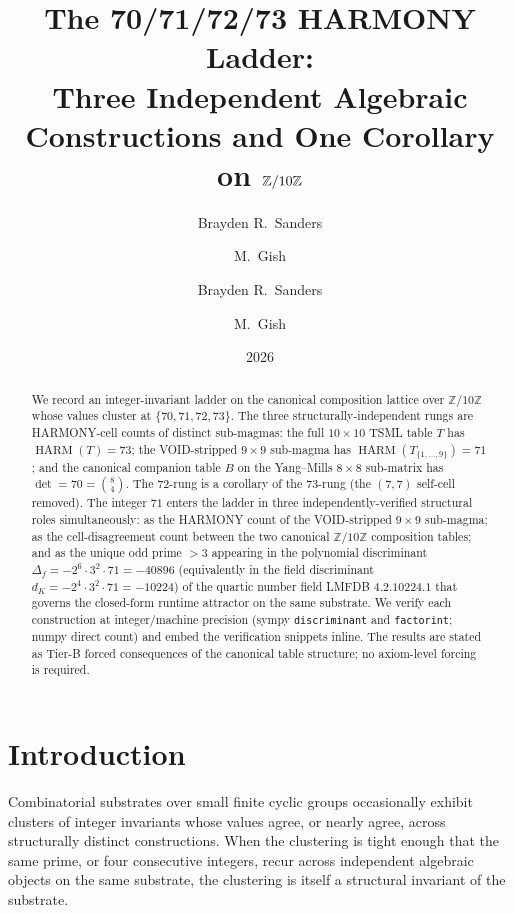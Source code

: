 \documentclass[11pt,reqno]{amsart}
\title[The 70/71/72/73 HARMONY Ladder]
  {The 70/71/72/73 HARMONY Ladder:\\
   Three Independent Algebraic Constructions and One Corollary
   on $\Z/10\Z$}
\author{Brayden R.\ Sanders \and M.\ Gish}
\author{Brayden R.\ Sanders \and M.\ Gish}
\date{2026}
\theoremstyle{definition}
\newcommand{\Z}{\mathbb{Z}}
\DeclareMathOperator{\HARM}{HARM}
\begin{document}
\begin{abstract}
We record an integer-invariant ladder on the canonical composition
lattice over $\Z/10\Z$ whose values cluster at $\{70, 71, 72, 73\}$.
The three structurally-independent rungs are HARMONY-cell counts of
distinct sub-magmas: the full $10 \times 10$ TSML table $T$ has
$\HARM(T) = 73$; the VOID-stripped $9 \times 9$ sub-magma has
$\HARM(T_{\{1, \ldots, 9\}}) = 71$; and the canonical companion table
$B$ on the Yang--Mills $8 \times 8$ sub-matrix has $\det = 70 = \binom{8}{4}$.
The $72$-rung is a corollary of the $73$-rung (the $(7,7)$ self-cell
removed). The integer $71$ enters the ladder in three
independently-verified structural roles simultaneously: as the HARMONY
count of the VOID-stripped $9 \times 9$ sub-magma; as the
cell-disagreement count between the two canonical $\Z/10\Z$ composition
tables; and as the unique odd prime $>3$ appearing in the polynomial
discriminant $\Delta_f = -2^6 \cdot 3^2 \cdot 71 = -40896$ (equivalently
in the field discriminant $d_K = -2^4 \cdot 3^2 \cdot 71 = -10224$) of
the quartic number field LMFDB $4.2.10224.1$ that governs the
closed-form runtime attractor on the same substrate.
We verify each construction at integer/machine precision (sympy
\texttt{discriminant} and \texttt{factorint}; numpy direct count) and
embed the verification snippets inline. The results are stated as
Tier-B forced consequences of the canonical table structure; no
axiom-level forcing is required.
\end{abstract}

\maketitle

\section{Introduction}
\label{sec:intro}

Combinatorial substrates over small finite cyclic groups occasionally
exhibit clusters of integer invariants whose values agree, or nearly
agree, across structurally distinct constructions. When the
clustering is tight enough that the same prime, or four consecutive
integers, recur across independent algebraic objects on the same
substrate, the clustering is itself a structural invariant of the
substrate.
\end{document}
